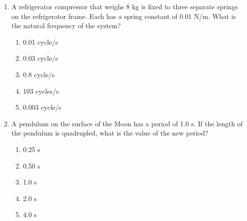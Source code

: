 \documentclass{../../../oss-apphys}
\begin{document}
\begin{multicols}{2}
\begin{enumerate}[leftmargin=18pt]
  \item A refrigerator compressor that weighs 8 kg is fixed to three separate
    springs on the refrigerator frame. Each has a spring constant of 0.01
    N/m. What is the natural frequency of the system?
    \begin{enumerate}[noitemsep,topsep=0pt,leftmargin=18pt,label=(\Alph*)]
    \item 0.01 cycle/s
    \item 0.03 cycle/s
    \item 0.8 cycle/s
    \item 103 cycles/s
    \item 0.003 cycle/s
    \end{enumerate}
    
    
  \item A pendulum on the surface of the Moon has a period of 1.0 s. If the
    length of the pendulum is quadrupled, what is the value of the new
    period?
    \begin{enumerate}[noitemsep,topsep=0pt,leftmargin=18pt,label=(\Alph*)]
    \item 0.25 s
    \item 0.50 s
    \item 1.0 s
    \item 2.0 s
    \item 4.0 s
    \end{enumerate}
    

\end{enumerate}
\end{multicols}
\end{document}
